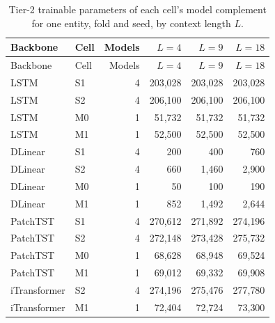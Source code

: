 \documentclass[a4paper,11pt]{article}
\begin{document}
\small
\setlength{\tabcolsep}{3pt}
\begin{longtable}{@{}llrrrr@{}}
\caption{Tier-2 trainable parameters of each cell's model complement for one entity, fold and seed, by context length $L$.}\label{tab:supp-t2-params}\\
\toprule
Backbone & Cell & Models & $L=4$ & $L=9$ & $L=18$ \\
\midrule
\endfirsthead
\toprule
Backbone & Cell & Models & $L=4$ & $L=9$ & $L=18$ \\
\midrule
\endhead
\bottomrule
\endfoot
LSTM & S1 & 4 & 203{,}028 & 203{,}028 & 203{,}028 \\
LSTM & S2 & 4 & 206{,}100 & 206{,}100 & 206{,}100 \\
LSTM & M0 & 1 & 51{,}732 & 51{,}732 & 51{,}732 \\
LSTM & M1 & 1 & 52{,}500 & 52{,}500 & 52{,}500 \\
DLinear & S1 & 4 & 200 & 400 & 760 \\
DLinear & S2 & 4 & 660 & 1{,}460 & 2{,}900 \\
DLinear & M0 & 1 & 50 & 100 & 190 \\
DLinear & M1 & 1 & 852 & 1{,}492 & 2{,}644 \\
PatchTST & S1 & 4 & 270{,}612 & 271{,}892 & 274{,}196 \\
PatchTST & S2 & 4 & 272{,}148 & 273{,}428 & 275{,}732 \\
PatchTST & M0 & 1 & 68{,}628 & 68{,}948 & 69{,}524 \\
PatchTST & M1 & 1 & 69{,}012 & 69{,}332 & 69{,}908 \\
iTransformer & S2 & 4 & 274{,}196 & 275{,}476 & 277{,}780 \\
iTransformer & M1 & 1 & 72{,}404 & 72{,}724 & 73{,}300 \\
\end{longtable}
\normalsize\setlength{\tabcolsep}{4pt}
\small
\setlength{\tabcolsep}{3pt}
\end{document}
